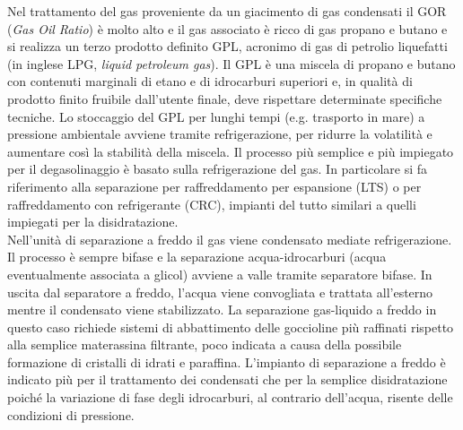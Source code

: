 Nel trattamento del gas proveniente da un giacimento di gas condensati il GOR (\textit{Gas Oil Ratio}) è molto alto e il gas associato è ricco di gas propano e butano e si realizza un terzo prodotto definito GPL, acronimo di gas di petrolio liquefatti (in inglese LPG, \textit{liquid petroleum gas}). Il GPL è una miscela di propano e butano con contenuti marginali di etano e di idrocarburi superiori e, in qualità di prodotto finito fruibile dall'utente finale, deve rispettare determinate specifiche tecniche. Lo stoccaggio del GPL per lunghi tempi (e.g. trasporto in mare) a pressione ambientale avviene tramite refrigerazione, per ridurre la volatilità e aumentare così la stabilità della miscela. Il processo più semplice e più impiegato per il degasolinaggio è basato sulla refrigerazione del gas. In particolare si fa riferimento alla separazione per raffreddamento per espansione (LTS) o per raffreddamento con refrigerante (CRC), impianti del tutto similari a quelli impiegati per la disidratazione.\\
Nell'unità di separazione a freddo il gas viene condensato mediate refrigerazione. Il processo è sempre bifase e la separazione acqua-idrocarburi (acqua eventualmente associata a glicol) avviene a valle tramite separatore bifase. In uscita dal separatore a freddo, l'acqua viene convogliata e trattata all'esterno mentre il condensato viene stabilizzato. La separazione gas-liquido a freddo in questo caso richiede sistemi di abbattimento delle goccioline più raffinati rispetto alla semplice materassina filtrante, poco indicata a causa della possibile formazione di cristalli di idrati e paraffina. L'impianto di separazione a freddo è indicato più per il trattamento dei condensati che per la semplice disidratazione poiché la variazione di fase degli idrocarburi, al contrario dell'acqua, risente delle condizioni di pressione.

